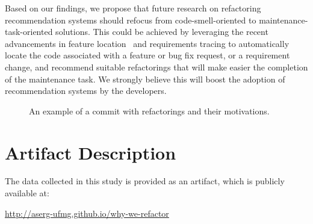 Based on our findings, we propose that future research on refactoring recommendation systems should refocus from 
code-smell-oriented to maintenance-task-oriented solutions.
This could be achieved by leveraging the recent advancements in feature location~\citep{Dit:2013} and requirements tracing to automatically locate the code
associated with a feature or bug fix request, or a requirement change, and recommend suitable refactorings that will make easier the completion
of the maintenance task.
We strongly believe this will boost the adoption of recommendation systems by the developers.




\begin{figure}[b]
	\centering
	\caption{An example of a commit with refactorings and their motivations.}
	\label{navDataset}
\end{figure}



\section{Artifact Description}

The data collected in this study is provided as an artifact, which is publicly available at:\margin

\noindent \url{http://aserg-ufmg.github.io/why-we-refactor}\margin

